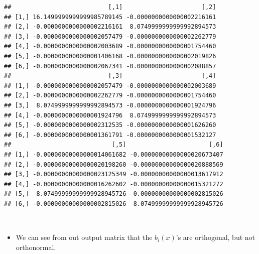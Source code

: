 \documentclass[]{article}
\begin{document}
\begin{verbatim}
##                           [,1]                      [,2]
## [1,] 16.1499999999999985789145 -0.0000000000000002216161
## [2,] -0.0000000000000002216161  8.0749999999999992894573
## [3,] -0.0000000000000002057479 -0.0000000000000002262779
## [4,] -0.0000000000000002003689 -0.0000000000000001754460
## [5,] -0.0000000000000001406168 -0.0000000000000002019826
## [6,] -0.0000000000000002067341 -0.0000000000000002088857
##                           [,3]                      [,4]
## [1,] -0.0000000000000002057479 -0.0000000000000002003689
## [2,] -0.0000000000000002262779 -0.0000000000000001754460
## [3,]  8.0749999999999992894573 -0.0000000000000001924796
## [4,] -0.0000000000000001924796  8.0749999999999992894573
## [5,] -0.0000000000000002312535 -0.0000000000000001626260
## [6,] -0.0000000000000001361791 -0.0000000000000001532127
##                            [,5]                       [,6]
## [1,] -0.00000000000000014061682 -0.00000000000000020673407
## [2,] -0.00000000000000020198260 -0.00000000000000020888569
## [3,] -0.00000000000000023125349 -0.00000000000000013617912
## [4,] -0.00000000000000016262602 -0.00000000000000015321272
## [5,]  8.07499999999999928945726 -0.00000000000000002815026
## [6,] -0.00000000000000002815026  8.07499999999999928945726
\end{verbatim}

~

\begin{itemize} \item[]
We can see from out output matrix that the $b_i(x)$'s are orthogonal, but not orthonormal.
\end{itemize}

~
\end{document}
